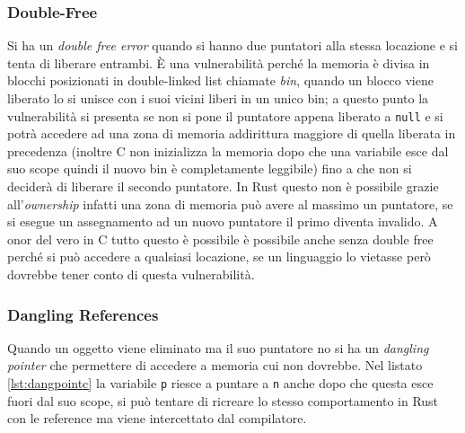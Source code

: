 \documentclass{article}
\begin{document}
\subsubsection{Double-Free} \label{sec:double_free}
Si ha un \textit{double free error} \cite[10.4.4]{gollmann:computersecurity} quando si hanno due puntatori alla stessa locazione e si tenta di liberare entrambi. È una vulnerabilità perché la memoria è divisa in blocchi posizionati in double-linked list chiamate \textit{bin}, quando un blocco viene liberato lo si unisce con i suoi vicini liberi in un unico bin; a questo punto la vulnerabilità si presenta se non si pone il puntatore appena liberato a \texttt{null} e si potrà accedere ad una zona di memoria addirittura maggiore di quella liberata in precedenza (inoltre C non inizializza la memoria dopo che una variabile esce dal suo scope quindi il nuovo bin è completamente leggibile) fino a che non si deciderà di liberare il secondo puntatore. In Rust questo non è possibile grazie all'\textit{ownership} infatti una zona di memoria può avere al massimo un puntatore, se si esegue un assegnamento ad un nuovo puntatore il primo diventa invalido.
A onor del vero in C tutto questo è possibile è possibile anche senza double free perché si può accedere a qualsiasi locazione, se un linguaggio lo vietasse però dovrebbe tener conto di questa vulnerabilità.




\subsubsection{Dangling References}
Quando un oggetto viene eliminato ma il suo puntatore no si ha un \textit{dangling pointer} che permettere di accedere a memoria cui non dovrebbe. Nel listato \ref{lst:dangpointc} la variabile \texttt{p} riesce a puntare a \texttt{n} anche dopo che questa esce fuori dal suo scope, si può tentare di ricreare lo stesso comportamento in Rust con le reference \cite[4.2]{rust:language} ma viene intercettato dal compilatore.






\end{document}
